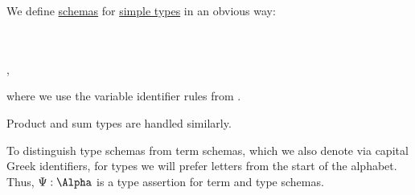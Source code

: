 \begin{definition}\label{def:simple_type_schema}
  We define \hyperref[con:schemas_and_instances]{schemas} for \hyperref[def:simple_type]{simple types} in an obvious way:
  \begin{bnf*}
        {} \\
       {\bnftsq{(} \bnfsp {} \bnfsp \bnftsq{\( \synimplies \)} \bnfsp {} \bnfsp \bnftsq{)}} \\
             { \bnfor {} \bnfor {}},
  \end{bnf*}
  where we use the variable identifier rules from .

  Product and sum types are handled similarly.
\end{definition}
\begin{comments}
  \item To distinguish type schemas from term schemas, which we also denote via capital Greek identifiers, for types we will prefer letters from the start of the alphabet. Thus, \( \Psi: \Alpha \) is a type assertion for term and type schemas.
\end{comments}

